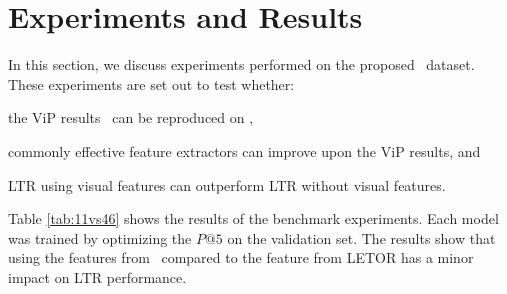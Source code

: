 
%



\section{Experiments and Results}
In this section, we discuss experiments performed on the proposed \datasetname~dataset.
These experiments are set out to test whether:
\begin{inparaenum}[(i)]
\item the ViP results~\cite{fan2017learning} can be reproduced on \datasetname, 
\item commonly effective feature extractors can improve upon the ViP results, and
\item \ac{LTR} using visual features can outperform \ac{LTR} without visual features. \end{inparaenum}

Table \ref{tab:11vs46} shows the results of the benchmark experiments. Each model was trained by optimizing the $P@5$ on the validation set. The results show that using the features from \datasetname~compared to the feature from LETOR has a minor impact on \ac{LTR} performance.
\fi

